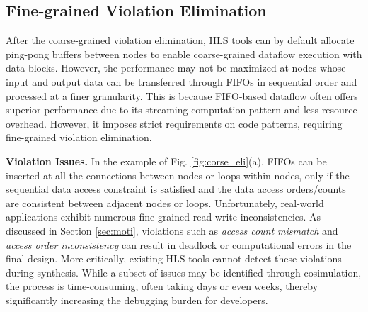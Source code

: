 \documentclass[conference]{IEEEtran}
\begin{document}


\subsection{Fine-grained Violation Elimination}\label{Fine-grained Violation Elimination}
\label{sec:fine-grain vio}
After the coarse-grained violation elimination, HLS tools can by default allocate ping-pong buffers between nodes to enable coarse-grained dataflow execution with data blocks.
However, the performance may not be maximized at nodes whose input and output data can be transferred through FIFOs in sequential order and processed at a finer granularity. This is because FIFO-based dataflow often offers superior performance due to its streaming computation pattern and less resource overhead. However, 
it imposes strict requirements on code patterns, requiring fine-grained violation elimination.


\textbf{Violation Issues.}
In the example of Fig. \ref{fig:corse_eli}(a), FIFOs can be inserted at all the connections between nodes or loops within nodes, only if the sequential data access constraint is satisfied and the data access orders/counts are consistent between adjacent nodes or loops. 
Unfortunately, real-world applications exhibit numerous fine-grained read-write inconsistencies. As discussed in Section \ref{sec:moti}, violations such as \textit{access count mismatch} and \textit{access order inconsistency} can result in deadlock or computational errors in the final design. 
More critically, existing HLS tools cannot detect these violations during synthesis. While a subset of issues may be identified through cosimulation, the process is time-consuming, often taking days or even weeks, thereby significantly increasing the debugging burden for developers. 
\end{document}
